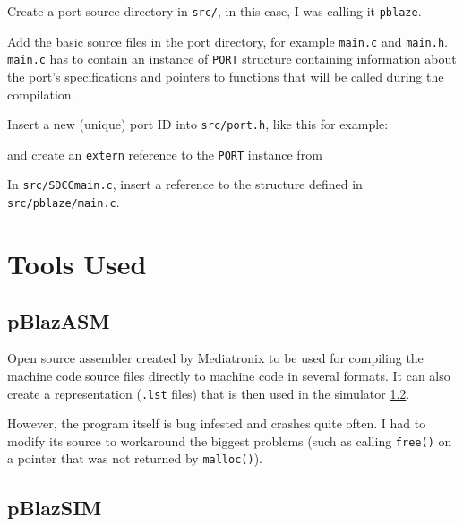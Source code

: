 
    Create a port source directory in \texttt{src/}, in this case, I was calling it \texttt{pblaze}.

    Add the basic source files in the port directory, for example \texttt{main.c} and \texttt{main.h}. \texttt{main.c} has to contain an instance of \texttt{PORT} structure containing information about the port's specifications and pointers to functions that will be called during the compilation.

    Insert a new (unique) port ID into \texttt{src/port.h}, like this for example:



    and create an \texttt{extern} reference to the \texttt{PORT} instance from %


    In \texttt{src/SDCCmain.c}, insert a reference to the structure defined in \texttt{src/pblaze/main.c}.

    

    \section{Tools Used}

        \subsection{pBlazASM}

        Open source assembler created by Mediatronix to be used for compiling the machine code source files directly to machine code in several formats. It can also create a representation (\texttt{.lst} files) that is then used in the simulator \ref{pblazsim}.

        However, the program itself is bug infested and crashes quite often. I had to modify its source to workaround the biggest problems (such as calling \texttt{free()} on a pointer that was not returned by \texttt{malloc()}).

        \subsection{pBlazSIM}\label{pblazsim}

